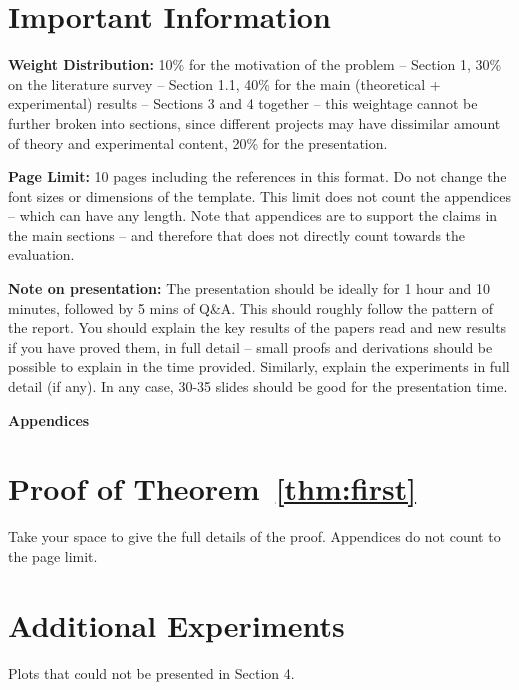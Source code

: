 \documentclass[twoside]{article}
\begin{document}
\section*{Important Information}

{\bf Weight Distribution:} 10\% for the motivation of the problem -- Section 1, 30\% on the literature survey -- Section 1.1, 40\% for the main (theoretical + experimental) results -- Sections 3 and 4 together -- this weightage cannot be further broken into sections, since different projects may have dissimilar amount of theory and experimental content, 20\% for the presentation.

{\bf Page Limit:} 10 pages including the references in this format. Do not change the font sizes or dimensions of the template. This limit does not count the appendices -- which can have any length. Note that appendices are to support the claims in the main sections -- and therefore that does not directly count towards the evaluation.

{\bf Note on presentation:} The presentation should be ideally for 1 hour and 10 minutes, followed by 5 mins of Q\&A. This should roughly follow the pattern of the report. You should explain the key results of the papers read and new results if you have proved them, in full detail -- small proofs and derivations should be possible to explain in the time provided. Similarly, explain the experiments in full detail (if any). In any case, 30-35 slides should be good for the presentation time.

\clearpage
\begin{center}
 \Large{\bf Appendices}
\end{center}

\appendix

\section{Proof of Theorem~\ref{thm:first}}

Take your space to give the full details of the proof. Appendices do not count to the page limit.

\section{Additional Experiments}

Plots that could not be presented in Section 4.
\end{document}

